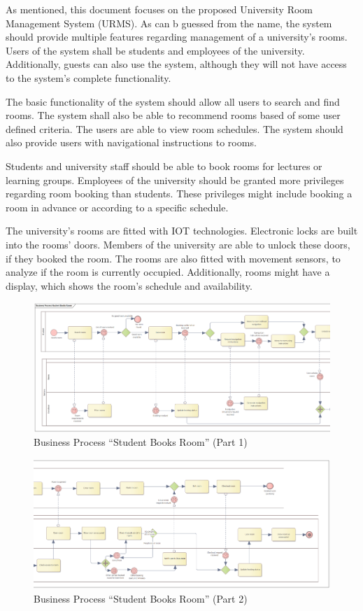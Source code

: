 \documentclass[conference,onecolumn]{IEEEtran}
\begin{document}
As mentioned, this document focuses on the proposed University Room Management System (URMS).
As can b guessed from the name, the system should provide multiple features regarding management of a university's rooms.
Users of the system shall be students and employees of the university. Additionally, guests can also use the system, although they will not have access to the system's complete functionality.

The basic functionality of the system should allow all users to search and find rooms. The system shall also be able to recommend rooms based of some user defined criteria. The users are able to view room schedules.
The system should also provide users with navigational instructions to rooms.

Students and university staff should be able to book rooms for lectures or learning groups. Employees of the university should be granted more privileges regarding room booking than students. These privileges might include booking a room in advance or according to a specific schedule.

The university's rooms are fitted with IOT technologies.
Electronic locks are built into the rooms' doors. Members of the university are able to unlock these doors, if they booked the room.
The rooms are also fitted with movement sensors, to analyze if the room is currently occupied.
Additionally, rooms might have a display, which shows the room's schedule and availability.

\begin{figure}
	\includegraphics[width=\linewidth]{Figures/BPMN_StudentBooksRoom_1.png}
	\caption{Business Process ``Student Books Room'' (Part 1)}
	\label{fig:bpmn_1}
\end{figure}

\begin{figure}
	\includegraphics[width=\linewidth]{Figures/BPMN_StudentBooksRoom_2.png}
	\caption{Business Process ``Student Books Room'' (Part 2)}
	\label{fig:bpmn_2}
\end{figure}
\end{document}
